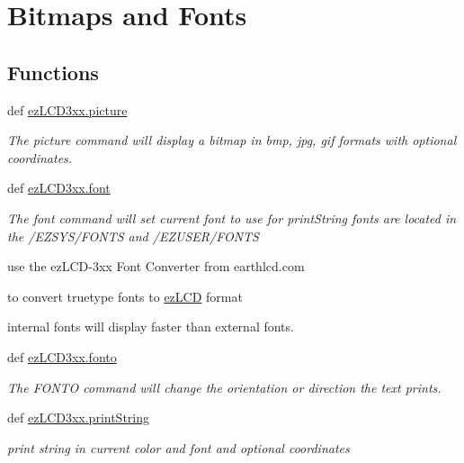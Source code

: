 \hypertarget{group___bitmap_font}{\section{Bitmaps and Fonts}
\label{group___bitmap_font}
}
\subsection*{Functions}
\begin{DoxyCompactItemize}
\item 
def \hyperlink{group___bitmap_font_ga3bdde0a3f8505adbfb3c4b7107da7650}{ez\-L\-C\-D3xx.\-picture}
\begin{DoxyCompactList}\small\item\em The picture command will display a bitmap in bmp, jpg, gif formats with optional coordinates. \end{DoxyCompactList}\item 
def \hyperlink{group___bitmap_font_ga7099c8ffc9b76ad3213d241bb8b8070f}{ez\-L\-C\-D3xx.\-font}
\begin{DoxyCompactList}\small\item\em The font command will set current font to use for print\-String fonts are located in the /\-E\-Z\-S\-Y\-S/\-F\-O\-N\-T\-S and /\-E\-Z\-U\-S\-E\-R/\-F\-O\-N\-T\-S \par
 use the ez\-L\-C\-D-\/3xx Font Converter from earthlcd.\-com \par
 to convert truetype fonts to \hyperlink{classez_l_c_d3xx_1_1ez_l_c_d}{ez\-L\-C\-D} format \par
 internal fonts will display faster than external fonts. \end{DoxyCompactList}\item 
def \hyperlink{group___bitmap_font_ga445e7a916dbdae456f88bea5fcd88745}{ez\-L\-C\-D3xx.\-fonto}
\begin{DoxyCompactList}\small\item\em The F\-O\-N\-T\-O command will change the orientation or direction the text prints. \end{DoxyCompactList}\item 
def \hyperlink{group___bitmap_font_gac3a90d479a0423de66988b9850f4852c}{ez\-L\-C\-D3xx.\-print\-String}
\begin{DoxyCompactList}\small\item\em print string in current color and font and optional coordinates \end{DoxyCompactList}\end{DoxyCompactItemize}



